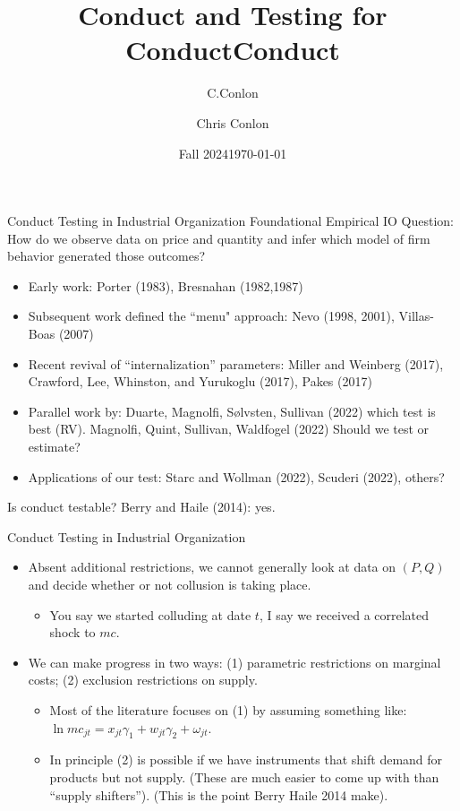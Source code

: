 \documentclass[aspectratio=169,10pt]{beamer}
\title{Conduct and Testing for Conduct}
\author{C.Conlon}
\institute{Grad IO }
\date{Fall 2024}
\begin{document}
\title{Conduct}
\author{Chris Conlon}
\date{\today}

\frame{\titlepage}


\begin{frame}[plain]{Conduct Testing in Industrial Organization}
Foundational Empirical IO Question: How do we observe data on price and quantity and infer which model of firm behavior generated those outcomes?

\begin{itemize}
\item Early work: Porter (1983), Bresnahan (1982,1987)
\item Subsequent work defined the ``menu" approach: Nevo (1998, 2001), Villas-Boas (2007) 
\item Recent revival of ``internalization'' parameters: Miller and Weinberg (2017), Crawford, Lee, Whinston, and Yurukoglu (2017), Pakes (2017)
\item Parallel work by: Duarte, Magnolfi, Sølvsten, Sullivan (2022) which test is best (RV). Magnolfi, Quint, Sullivan, Waldfogel (2022) Should we test or estimate?
\item Applications of our test: Starc and Wollman (2022), Scuderi (2022), others?
\end{itemize}
Is conduct testable? Berry and Haile (2014): yes.
\end{frame}


\begin{frame}{Conduct Testing in Industrial Organization}
\begin{itemize}
\item Absent additional restrictions, we cannot generally look at data on $(P,Q)$ and decide whether or not collusion is taking place.
\begin{itemize}
\item You say we started colluding at date $t$, I say we received a correlated shock to $mc$.
\end{itemize}
\item We can make progress in two ways: (1) parametric restrictions on marginal costs; (2) exclusion restrictions on supply.
\begin{itemize}
\item Most of the literature focuses on (1) by assuming something like: $\ln mc_{jt} = x_{jt} \gamma_1 + w_{jt} \gamma_2 + \omega_{jt}$.
\item In principle (2) is possible if we have instruments that shift demand for products but not supply. (These are much easier to come up with than ``supply shifters''). (This is the point Berry Haile 2014 make).
\end{itemize}
\end{itemize}
\end{frame}
\end{document}
